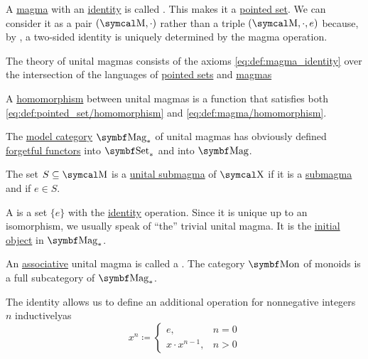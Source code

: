 \begin{definition}\label{def:unital_magma}
  A \hyperref[def:magma]{magma} with an \hyperref[def:magma_identity]{identity} is called . This makes it a \hyperref[def:pointed_set]{pointed set}. We can consider it as a pair \( (\CM, \cdot) \) rather than a triple \( (\CM, \cdot, e) \) because, by , a two-sided identity is uniquely determined by the magma operation.

  \begin{DefEnum}
     The theory of unital magmas consists of the axioms \eqref{eq:def:magma_identity} over the intersection of the languages of \hyperref[def:pointed_set/theory]{pointed sets} and \hyperref[def:magma/theory]{magmas}

     A \hyperref[def:first_order_homomorphism]{homomorphism} between unital magmas is a function that satisfies both \eqref{eq:def:pointed_set/homomorphism} and \eqref{eq:def:magma/homomorphism}.

     The \hyperref[def:first_order_model_category]{model category} \( \Cat{Mag}_* \) of unital magmas has obviously defined \hyperref[def:forgetful_functor]{forgetful functors} into \hyperref[def:pointed_set/category]{\( \Cat{Set}_* \)} and into \hyperref[def:magma/category]{\( \Cat{Mag} \)}.

     The set \( S \subseteq \CM \) is a \hyperref[def:first_order_substructure]{unital submagma} of \( \CX \) if it is a \hyperref[def:magma/substructure]{submagma} and if \( e \in S \).

     A  is a set \( \{ e \} \) with the \hyperref[def:function/diagonal]{identity} operation. Since it is unique up to an isomorphism, we usually speak of \enquote{the} trivial unital magma. It is the \hyperref[def:zero_objects/initial]{initial object} in \( \Cat{Mag}_* \).

     An \hyperref[eq:def:magma/associative]{associative} unital magma is called a . The category \( \Cat{Mon} \) of monoids is a full subcategory of \( \Cat{Mag}_* \).

     The identity allows us to define an additional  operation for nonnegative integers \( n \) inductively\IND as
    \begin{equation*}
      x^n \coloneqq \begin{cases}
        e,               & n = 0 \\
        x \cdot x^{n-1}, & n > 0
      \end{cases}
    \end{equation*}
  \end{DefEnum}
\end{definition}

